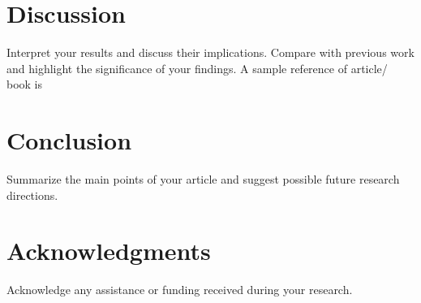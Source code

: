 \documentclass[10pt]{article}
\begin{document}
\section{Discussion}
Interpret your results and discuss their implications. Compare with previous work and highlight the significance of your findings.
A sample reference of article/ book is \cite{goossens1994latex}
\section{Conclusion}
Summarize the main points of your article and suggest possible future research directions.

\section*{Acknowledgments}
Acknowledge any assistance or funding received during your research.
\end{document}
